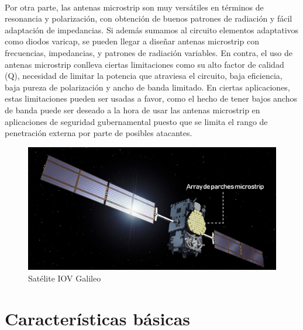 \\
\par Por otra parte, las antenas microstrip son muy versátiles en términos de resonancia y polarización, con obtención de buenos patrones de radiación y fácil adaptación de impedancias. Si además sumamos al circuito elementos adaptativos como diodos varicap, se pueden llegar a diseñar antenas microstrip con frecuencias, impedancias, y patrones de radiación variables. En contra, el uso de antenas microstrip conlleva ciertas limitaciones como su alto factor de calidad (Q), necesidad de limitar la potencia que atraviesa el circuito, baja eficiencia, baja pureza de polarización y ancho de banda limitado. En ciertas aplicaciones, estas limitaciones pueden ser usadas a favor, como el hecho de tener bajos anchos de banda puede ser deseado a la hora de usar las antenas microstrip en aplicaciones de seguridad gubernamental puesto que se limita el rango de penetración externa por parte de posibles atacantes.

\begin{figure}[h]
    \centering
        \includegraphics[width=15cm]{archivos/sate}
        \caption{Satélite IOV Galileo}
        \label{fig:satgalileo}
\end{figure}

\section{Características básicas}


